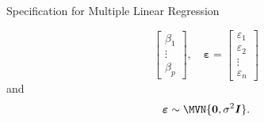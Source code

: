 \documentclass[final]{article}\usepackage[]{graphicx}\usepackage[svgnames]{xcolor}
\providecommand{\RandomVector}[1]{\bm{#1}}%
\providecommand{\Vector}[1]{\bm{#1}}%
\providecommand{\Matrix}[1]{\bm{#1}}
\begin{document}
\begin{Regular}{Specification for Multiple Linear Regression}
\begin{itemize}
\[\begin{bmatrix}
                      \beta_1 \\
                      \vdots  \\
                      \beta_p
                  \end{bmatrix},\quad
                  \RandomVector{\varepsilon}=\begin{bmatrix}
                      \varepsilon_1 \\
                      \varepsilon_2 \\
                      \vdots        \\
                      \varepsilon_n
                  \end{bmatrix} \]
              and
              \[ \RandomVector{\varepsilon}\sim \MVN{\Vector{0},\sigma^2\Matrix{I}}. \]
    \end{itemize}
\end{Regular}
\end{document}
